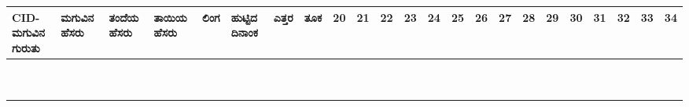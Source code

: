 ﻿\documentclass[12pt]{article}
\newcommand{\kn}[1]{%
{\fontspec[Script=Kannada]{Kedage}%
#1
}}
\begin{document}
\begin{tabular}{|l|p{3cm}|p{3cm}|p{3cm}|p{1.5cm}|p{1.5cm}|l|l|l|l|l|l|l|l|l|l|l|l|l|l|l|l|l|}
\makecell[b]{CID-\\ \kn{ಮಗುವಿನ ಗುರುತು}} & \kn{ಮಗುವಿನ ಹೆಸರು} & \kn{ತಂದೆಯ ಹೆಸರು} & \kn{ತಾಯಿಯ ಹೆಸರು} & \kn{ಲಿಂಗ} & \kn{ಹುಟ್ಟಿದ ದಿನಾಂಕ} & \kn{ಎತ್ತರ} & \kn{ತೂಕ} & 20 & 21 & 22 & 23 & 24 & 25 & 26 & 27 & 28 & 29 & 30 & 31 & 32 & 33 & 34 \\ \hline
& & & & & & & &  & & & & & & & & & & & & & & \\ \hline
& & & & & & & &  & & & & & & & & & & & & & & \\ \hline
& & & & & & & &  & & & & & & & & & & & & & & \\ \hline 
& & & & & & & &  & & & & & & & & & & & & & & \\ \hline
& & & & & & & &  & & & & & & & & & & & & & & \\ \hline
& & & & & & & &  & & & & & & & & & & & & & & \\ \hline
& & & & & & & &  & & & & & & & & & & & & & & \\ \hline
& & & & & & & &  & & & & & & & & & & & & & & \\ \hline
& & & & & & & &  & & & & & & & & & & & & & & \\ \hline
& & & & & & & &  & & & & & & & & & & & & & & \\ \hline

\end{tabular}

\pagebreak

\end{document}
